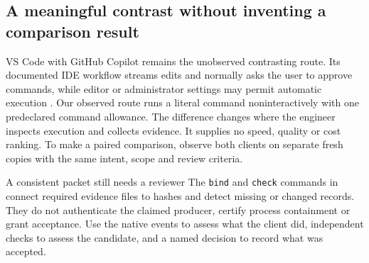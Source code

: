 \subsection*{A meaningful contrast without inventing a comparison result}

VS Code with GitHub Copilot remains the unobserved contrasting route. Its documented IDE workflow streams edits and normally asks the user to approve commands, while editor or administrator settings may permit automatic execution \parencite{githubCopilotAgent2026}. Our observed route runs a literal command noninteractively with one predeclared command allowance. The difference changes where the engineer inspects execution and collects evidence. It supplies no speed, quality or cost ranking. To make a paired comparison, observe both clients on separate fresh copies with the same intent, scope and review criteria.

\begin{readerbox}{A consistent packet still needs a reviewer}
The \texttt{bind} and \texttt{check} commands in  connect required evidence files to hashes and detect missing or changed records. They do not authenticate the claimed producer, certify process containment or grant acceptance. Use the native events to assess what the client did, independent checks to assess the candidate, and a named decision to record what was accepted.
\end{readerbox}

